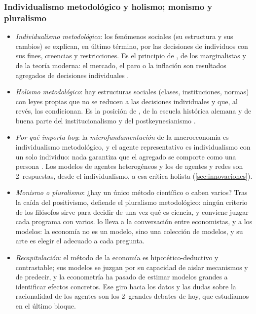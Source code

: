 \documentclass[11pt]{article}
\begin{document}
\subsubsection{Individualismo metodológico y holismo; monismo y pluralismo}\label{sec:individualismo-pluralismo}

\begin{itemize}
\item \emph{Individualismo metodológico}: los fenómenos sociales (su estructura y sus cambios) se explican, en último término, por las decisiones de individuos con sus fines, creencias y restricciones. Es el principio de , de los marginalistas y de la teoría moderna: el mercado, el paro o la inflación son resultados agregados de decisiones individuales .
\item \emph{Holismo metodológico}: hay estructuras sociales (clases, instituciones, normas) con leyes propias que no se reducen a las decisiones individuales y que, al revés, las condicionan. Es la posición de , de la escuela histórica alemana y de buena parte del institucionalismo y del postkeynesianismo  .
\item \emph{Por qué importa hoy}: la \emph{microfundamentación} de la macroeconomía es individualismo metodológico, y el agente representativo es individualismo con un solo individuo: nada garantiza que el agregado se comporte como una persona\nocite{Kirman1992Whom} . Los modelos de agentes heterogéneos y los de agentes y redes son 2~respuestas, desde el individualismo, a esa crítica holista (\ref{sec:innovaciones}).
\item \emph{Monismo o pluralismo}: ¿hay un único método científico o caben varios? Tras la caída del positivismo, \textcite{Caldwell1982Beyond} defiende el pluralismo metodológico: ningún criterio de los filósofos sirve para decidir de una vez qué es ciencia, y conviene juzgar cada programa con varios. \textcite{McCloskey1983Rhetoric} lo lleva a la conversación entre economistas, y \textcite{Rodrik2015Rules} a los modelos: la economía no es un modelo, sino una colección de modelos, y su arte es elegir el adecuado a cada pregunta.
\item \emph{Recapitulación}: el método de la economía es hipotético-deductivo y contrastable; sus modelos se juzgan por su capacidad de aislar mecanismos y de predecir, y la econometría ha pasado de estimar modelos grandes a identificar efectos concretos. Ese giro hacia los datos y las dudas sobre la racionalidad de los agentes son los 2~grandes debates de hoy, que estudiamos en el último bloque.
\end{itemize}
\end{document}
